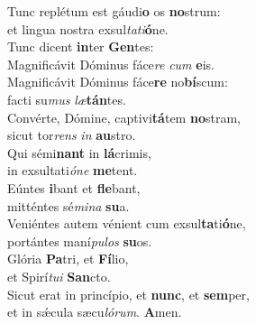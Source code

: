 \evenverse Tunc replétum est gáudi\textbf{o} os \textbf{no}strum:~\*\\
\evenverse et lingua nostra exsul\textit{ta}\textit{ti}\textbf{ó}ne.\\
\oddverse Tunc dicent \textbf{in}ter \textbf{Gen}tes:~\*\\
\oddverse Magnificávit Dóminus fáce\textit{re} \textit{cum} \textbf{e}is.\\
\evenverse Magnificávit Dóminus fáce\textbf{re} no\textbf{bí}scum:~\*\\
\evenverse facti su\textit{mus} \textit{læ}\textbf{tán}tes.\\
\oddverse Convérte, Dómine, captivi\textbf{tá}tem \textbf{no}stram,~\*\\
\oddverse sicut tor\textit{rens} \textit{in} \textbf{au}stro.\\
\evenverse Qui sémi\textbf{nant} in \textbf{lá}crimis,~\*\\
\evenverse in exsultati\textit{ó}\textit{ne} \textbf{me}tent.\\
\oddverse Eúntes \textbf{i}bant et \textbf{fle}bant,~\*\\
\oddverse mitténtes sé\textit{mi}\textit{na} \textbf{su}a.\\
\evenverse Veniéntes autem vénient cum exsul\textbf{ta}ti\textbf{ó}ne,~\*\\
\evenverse portántes maní\textit{pu}\textit{los} \textbf{su}os.\\
\oddverse Glória \textbf{Pa}tri, et \textbf{Fí}lio,~\*\\
\oddverse et Spirí\textit{tu}\textit{i} \textbf{San}cto.\\
\evenverse Sicut erat in princípio, et \textbf{nunc}, et \textbf{sem}per,~\*\\
\evenverse et in sǽcula sæcu\textit{ló}\textit{rum}. \textbf{A}men.\\

